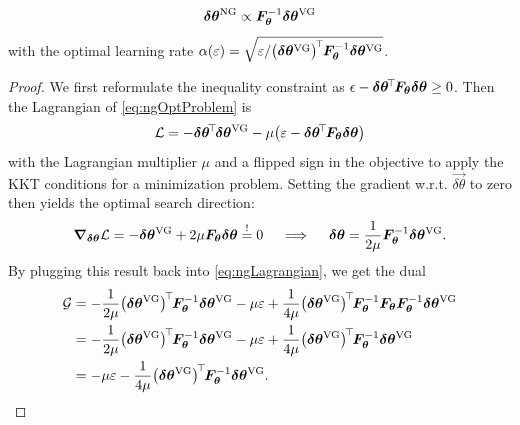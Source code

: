 		\begin{equation}
			\bm{\delta\theta}^\mathrm{NG} \propto \bm{F}_{\bm{\theta}}^{-1} \bm{\delta\theta}^\mathrm{VG}
		\end{equation}
		with the optimal learning rate \( \alpha(\varepsilon) = \sqrt{\varepsilon / \bigl(\bm{\delta\theta}^\mathrm{VG}\bigr)^{\!\top\!} \bm{F}_{\bm{\theta}}^{-1} \bm{\delta\theta}^\mathrm{VG}} \).
		\begin{proof}
			We first reformulate the inequality constraint as \( \epsilon - \bm{\delta\theta}^{\!\top\!} \bm{F}_{\bm{\theta}} \bm{\delta\theta} \geq 0 \). Then the Lagrangian of \eqref{eq:ngOptProblem} is
			\begin{equation}
				\mathcal{L} = -\bm{\delta\theta}^{\!\top\!} \bm{\delta\theta}^\mathrm{VG} - \mu \bigl( \varepsilon - \bm{\delta\theta}^{\!\top\!} \bm{F}_{\bm{\theta}} \bm{\delta\theta} \bigr)
				\label{eq:ngLagrangian}
			\end{equation}
			with the Lagrangian multiplier \(\mu\) and a flipped sign in the objective to apply the \ac{KKT} conditions for a minimization problem. Setting the gradient w.r.t. \( \vec{\delta\theta} \) to zero then yields the optimal search direction:
			\begin{equation}
				\grad_{\bm{\delta\theta}} \mathcal{L} = -\bm{\delta\theta}^\mathrm{VG} + 2 \mu \bm{F}_{\bm{\theta}} \bm{\delta\theta} \overset{!}{=} 0
				\quad\implies\quad
				\bm{\delta\theta} = \frac{1}{2 \mu} \bm{F}_{\bm{\theta}}^{-1} \bm{\delta\theta}^\mathrm{VG}.
				\label{eq:ngPrimal}
			\end{equation}
			By plugging this result back into \eqref{eq:ngLagrangian}, we get the dual
			\begin{align}
				\mathcal{G}
					&= -\frac{1}{2 \mu} \bigl(\vec{\delta\theta}^\mathrm{VG}\bigr)^\transposed \mat{F}_{\vec{\theta}}^{-1} \vec{\delta\theta}^\mathrm{VG} - \mu \varepsilon + \frac{1}{4 \mu} \bigl(\vec{\delta\theta}^\mathrm{VG}\bigr)^\transposed \mat{F}_{\vec{\theta}}^{-1} \mat{F}_{\vec{\theta}} \mat{F}_{\vec{\theta}}^{-1} \vec{\delta\theta}^\mathrm{VG} \\
					&= -\frac{1}{2 \mu} \bigl(\vec{\delta\theta}^\mathrm{VG}\bigr)^\transposed \mat{F}_{\vec{\theta}}^{-1} \vec{\delta\theta}^\mathrm{VG} - \mu \varepsilon + \frac{1}{4 \mu} \bigl(\vec{\delta\theta}^\mathrm{VG}\bigr)^\transposed \mat{F}_{\vec{\theta}}^{-1} \vec{\delta\theta}^\mathrm{VG} \\
					&= -\mu \varepsilon - \frac{1}{4 \mu} \bigl(\vec{\delta\theta}^\mathrm{VG}\bigr)^\transposed \mat{F}_{\vec{\theta}}^{-1} \vec{\delta\theta}^\mathrm{VG}.

\end{align}
\end{proof}
